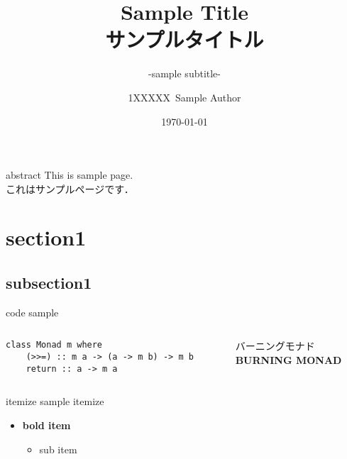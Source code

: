 \documentclass[aspectratio=1610,dvipdfmx,ja=standard,14pt]{beamer}
\title{%
    Sample Title \\
    サンプルタイトル
}
\subtitle{
    -sample subtitle-
}
\author{%
    1XXXXX\ Sample Author
}
\institute[Sample Univ.]{%
    Sample Univ. 
}
\date{%
    \today
}
\begin{document}
%
%
\begin{frame}
\maketitle 
\end{frame}

\begin{frame}[fragile]{abstract}
This is sample page.\\[4pt] 
これはサンプルページです．
\end{frame}

\section{section1}
\subsection{subsection1}

\begin{frame}
    \tableofcontents[currentsection]
\end{frame}

\begin{frame}[fragile]{code sample}
    \begin{columns}
        \begin{column}{0.5\textwidth}
            \begin{lstlisting}
class Monad m where 
    (>>=) :: m a -> (a -> m b) -> m b 
    return :: a -> m a
            \end{lstlisting}
        \end{column}
        \begin{column}{0.5\textwidth}
            バーニングモナド \\
            \textbf{BURNING MONAD}
        \end{column}
    \end{columns}
\end{frame}

\begin{frame}{itemize sample}
    itemize
    \begin{itemize}
        \item \textbf{bold item}
        \begin{itemize}
            \item sub item
        \end{itemize}
    \end{itemize}
\end{frame}
\end{document}
